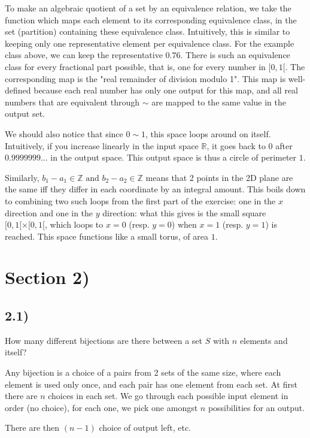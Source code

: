 \documentclass[12pt, letterpaper, twoside]{report}
\begin{document}
To make an algebraic quotient of a set by an equivalence relation, we take the function which maps each element to its corresponding equivalence class, in the set (partition) containing these equivalence class. Intuitively, this is similar to keeping only one representative element per equivalence class. For the example class above, we can keep the representative $0.76$. There is such an equivalence class for every fractional part possible, that is, one for every number in $[0, 1[$. The corresponding map is the "real remainder of division modulo 1". This map is well-defined because each real number has only one output for this map, and all real numbers that are equivalent through $\sim$ are mapped to the same value in the output set.

We should also notice that since $0 \sim 1$, this space loops around on itself. Intuitively, if you increase linearly in the input space $\mathbb{R}$, it goes back to $0$ after $0.9999999...$ in the output space. This output space is thus a circle of perimeter $1$.

Similarly, $b_1 - a_1 \in \mathbb{Z} \text{ and } b_2 - a_2 \in \mathbb{Z}$ means that 2 points in the 2D plane are the same iff they differ in each coordinate by an integral amount. This boils down to combining two such loops from the first part of the exercise: one in the $x$ direction and one in the $y$ direction: what this gives is the small square $[0, 1[ \times [0, 1[$, which loops to $x = 0$ (resp. $y = 0$) when $x = 1$ (resp. $y = 1$) is reached. This space functions like a small torus, of area $1$.
\section*{Section 2)}

\subsection*{2.1)}

How many different bijections are there between a set $S$ with $n$ elements and itself?

Any bijection is a choice of a pairs from 2 sets of the same size, where each element is used only once, and each pair has one element from each set. At first there are $n$ choices in each set. We go through each possible input element in order (no choice), for each one, we pick one amongst $n$ possibilities for an output.

There are then $(n-1)$ choice of output left, etc.
\end{document}
